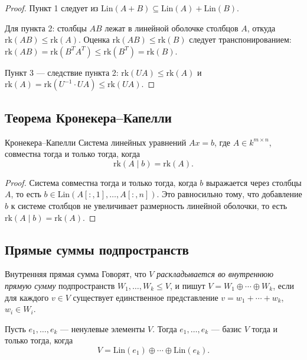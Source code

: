 \begin{proof}
Пункт 1 следует из $\mathrm{Lin}(A+B) \subseteq \mathrm{Lin}(A) + \mathrm{Lin}(B)$.

Для пункта 2: столбцы $AB$ лежат в линейной оболочке столбцов $A$, откуда $\mathrm{rk}(AB) \leq \mathrm{rk}(A)$. Оценка $\mathrm{rk}(AB) \leq \mathrm{rk}(B)$ следует транспонированием: $\mathrm{rk}(AB) = \mathrm{rk}(B^T A^T) \leq \mathrm{rk}(B^T) = \mathrm{rk}(B)$.

Пункт 3 — следствие пункта 2: $\mathrm{rk}(UA) \leq \mathrm{rk}(A)$ и $\mathrm{rk}(A) = \mathrm{rk}(U^{-1} \cdot UA) \leq \mathrm{rk}(UA)$.
\end{proof}

\subsection{Теорема Кронекера--Капелли}

\begin{Theorem}{Кронекера--Капелли}{}
    Система линейных уравнений $Ax = b$, где $A \in k^{m \times n}$, совместна тогда и только тогда, когда
    \[
        \mathrm{rk}(A \mid b) = \mathrm{rk}(A).
    \]
\end{Theorem}

\begin{proof}
Система совместна тогда и только тогда, когда $b$ выражается через столбцы $A$, то есть $b \in \mathrm{Lin}(A[{:},1], \ldots, A[{:},n])$. Это равносильно тому, что добавление $b$ к системе столбцов не увеличивает размерность линейной оболочки, то есть $\mathrm{rk}(A \mid b) = \mathrm{rk}(A)$.
\end{proof}

\subsection{Прямые суммы подпространств}

\begin{Definition}{Внутренняя прямая сумма}{}
    Говорят, что $V$ \emph{раскладывается во внутреннюю прямую сумму} подпространств $W_1, \ldots, W_k \leq V$, и пишут $V = W_1 \oplus \cdots \oplus W_k$, если для каждого $v \in V$ существует единственное представление $v = w_1 + \cdots + w_k$, $w_i \in W_i$.
\end{Definition}

\begin{Remark}{}{}
    Пусть $e_1, \ldots, e_k$ — ненулевые элементы $V$. Тогда $e_1, \ldots, e_k$ — базис $V$ тогда и только тогда, когда
    \[
        V = \mathrm{Lin}(e_1) \oplus \cdots \oplus \mathrm{Lin}(e_k).
    \]
\end{Remark}


